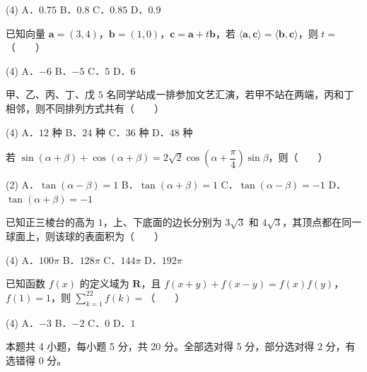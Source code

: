 \begin{gkopts}(4)
\task A．$0.75$
\task B．$0.8$
\task C．$0.85$
\task D．$0.9$
\end{gkopts}

已知向量 $\boldsymbol a=(3,4)$，$\boldsymbol b=(1,0)$，$\boldsymbol c=\boldsymbol a+t\boldsymbol b$，若 $\langle\boldsymbol a,\boldsymbol c\rangle=\langle\boldsymbol b,\boldsymbol c\rangle$，则 $t=$（　　）

\begin{gkopts}(4)
\task A．$-6$
\task B．$-5$
\task C．$5$
\task D．$6$
\end{gkopts}

甲、乙、丙、丁、戊 $5$ 名同学站成一排参加文艺汇演，若甲不站在两端，丙和丁相邻，则不同排列方式共有（　　）

\begin{gkopts}(4)
\task A．$12$ 种
\task B．$24$ 种
\task C．$36$ 种
\task D．$48$ 种
\end{gkopts}

若 $\sin(\alpha+\beta)+\cos(\alpha+\beta)=2\sqrt2\cos\left(\alpha+\dfrac\pi4\right)\sin\beta$，则（　　）

\begin{gkopts}(2)
\task A．$\tan(\alpha-\beta)=1$
\task B．$\tan(\alpha+\beta)=1$
\task C．$\tan(\alpha-\beta)=-1$
\task D．$\tan(\alpha+\beta)=-1$
\end{gkopts}

已知正三棱台的高为 $1$，上、下底面的边长分别为 $3\sqrt3$ 和 $4\sqrt3$，其顶点都在同一球面上，则该球的表面积为（　　）

\begin{gkopts}(4)
\task A．$100\pi$
\task B．$128\pi$
\task C．$144\pi$
\task D．$192\pi$
\end{gkopts}

已知函数 $f(x)$ 的定义域为 $\mathbf R$，且 $f(x+y)+f(x-y)=f(x)f(y)$，$f(1)=1$，则 $\displaystyle\sum_{k=1}^{22}f(k)=$（　　）

\begin{gkopts}(4)
\task A．$-3$
\task B．$-2$
\task C．$0$
\task D．$1$
\end{gkopts}

\par\medskip


\begin{gktip}
本题共 4 小题，每小题 5 分，共 20 分。全部选对得 5 分，部分选对得 2 分，有选错得 0 分。
\end{gktip}

